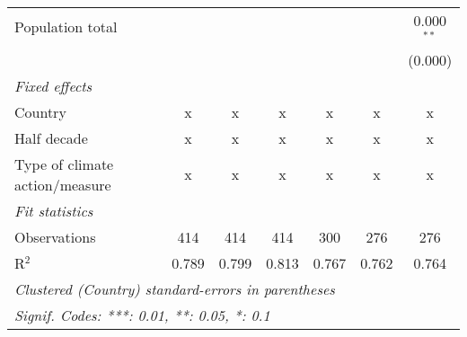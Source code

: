 \begin{tabular}{lcccccc}
   Population total                                               &         &                &                &                &                & 0.000$^{**}$\\   
                                                                  &         &                &                &                &                & (0.000)\\   
   \emph{Fixed effects}\\
   Country                                                        & x       & x              & x              & x              & x              & x\\  
   Half decade                                                    & x       & x              & x              & x              & x              & x\\  
   Type of climate action/measure                                 & x       & x              & x              & x              & x              & x\\  
   \midrule \emph{Fit statistics}\\
   Observations                                                   & 414     & 414            & 414            & 300            & 276            & 276\\  
   R$^2$                                                          & 0.789   & 0.799          & 0.813          & 0.767          & 0.762          & 0.764\\  
   \midrule
   \multicolumn{7}{l}{\emph{Clustered (Country) standard-errors in parentheses}}\\
   \multicolumn{7}{l}{\emph{Signif. Codes: ***: 0.01, **: 0.05, *: 0.1}}\\
\end{tabular}
\par\endgroup


